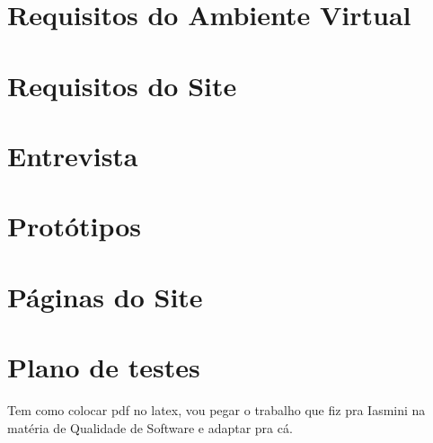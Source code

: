 \chapter{Requisitos do Ambiente Virtual}\label{apendice}


\chapter{Requisitos do Site} \label{Apendice B}


\chapter{Entrevista}\label{ap:entrevista}


\chapter{Protótipos}\label{prototipos}


\chapter{Páginas do Site}\label{apendice paginas site}
\label{ap:páginas_do_site}

\chapter{Plano de testes}\label{ap:plano de testes}
Tem como colocar pdf no latex, vou pegar o trabalho que fiz pra Iasmini na matéria de Qualidade de Software e adaptar pra cá.